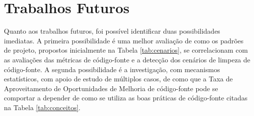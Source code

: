 \section{Trabalhos Futuros}

Quanto aos trabalhos futuros, foi possível identificar duas possibilidades imediatas. A primeira possibilidade é uma melhor avaliação de como os padrões de projeto, propostos inicialmente na Tabela \ref{tab:cenarios}, se correlacionam com as avaliações das métricas de código-fonte e a detecção dos cenários de limpeza de código-fonte. A segunda possibilidade é a investigação, com mecanismos estatísticos, com apoio de estudo de múltiplos casos, de como que a Taxa de Aproveitamento de Oportunidades de Melhoria de código-fonte pode se comportar a depender de como se utiliza as boas práticas de código-fonte citadas na Tabela \ref{tab:conceitos}.